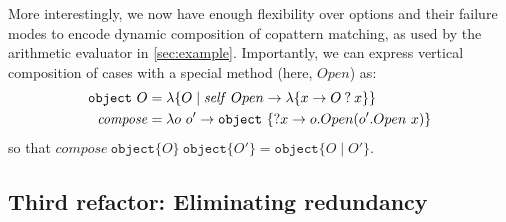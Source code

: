 \documentclass[sigplan,screen]{acmart}
\begin{document}
More interestingly, we now have enough flexibility over options and their
failure modes to encode dynamic composition of copattern matching, as used by
the arithmetic evaluator in \cref{sec:example}.  Importantly, we can express
vertical composition of cases with a special method (here, $\mathit{Open}$) as:
\begin{align*}
  \mathtt{object}~O
  &=
  \lambda \{ O \mid \mathit{self}~Open \to \lambda\{x \to O \mathbin{?} x\} \}
  \\
  \mathit{compose}
  &=
  \lambda o ~ o' \to
  \mathtt{object}~\{\mathbin{?} x \to o.Open(o'.Open ~ x)\}
\end{align*}
so that
$\mathit{compose}~\mathtt{object}\{O\}~\mathtt{object}\{O'\} =
\mathtt{object}\{O \mid O'\}$.


\subsection{Third refactor: Eliminating redundancy}

\end{document}
